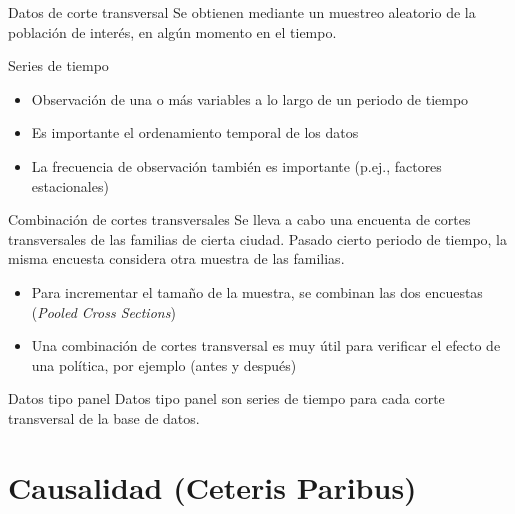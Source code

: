 \documentclass[11pt,handout]{beamer}
\begin{document}
\begin{frame}
{Datos de corte transversal}
\pause 
Se obtienen mediante un muestreo aleatorio de la poblaci\'on de inter\'es, en alg\'un momento en el tiempo.
\end{frame}

\begin{frame}
{Series de tiempo}
\pause 
\begin{itemize}[<+->]
	\item Observaci\'on de una o m\'as variables a lo largo de un periodo de tiempo
	\item Es importante el ordenamiento temporal de los datos
	\item La frecuencia de observaci\'on tambi\'en es importante (p.ej., factores estacionales)
\end{itemize}
\end{frame}

\begin{frame}
{Combinaci\'on de cortes transversales}
\pause 
Se lleva a cabo una encuenta de cortes transversales de las familias de cierta ciudad. \pause Pasado cierto periodo de tiempo, la misma encuesta considera otra muestra de las familias.
\pause
\begin{itemize}[<+->]
	\item Para incrementar el tama\~no de la muestra, se combinan las dos encuestas (\textit{Pooled Cross Sections})
	\item Una combinaci\'on de cortes transversal es muy \'util para verificar el efecto de una pol\'itica, por ejemplo (antes y despu\'es)
\end{itemize}
\end{frame}

\begin{frame}
{Datos tipo panel}
\pause 
Datos tipo panel son series de tiempo para cada corte transversal de la base de datos. 
\end{frame}

\section{Causalidad (Ceteris Paribus)}
\end{document}
